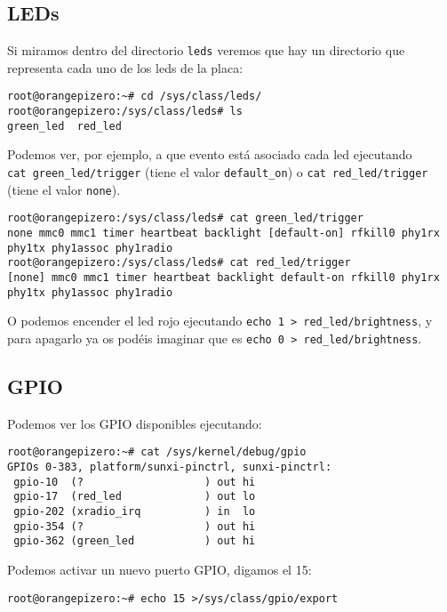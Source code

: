 \documentclass[12pt,spanish,]{scrartcl}
\begin{document}
\hypertarget{leds}{%
\subsection{LEDs}\label{leds}}

Si miramos dentro del directorio \texttt{leds} veremos que hay un
directorio que representa cada uno de los leds de la placa:

\begin{verbatim}
root@orangepizero:~# cd /sys/class/leds/
root@orangepizero:/sys/class/leds# ls
green_led  red_led
\end{verbatim}

Podemos ver, por ejemplo, a que evento está asociado cada led ejecutando
\texttt{cat\ green\_led/trigger} (tiene el valor \texttt{default\_on}) o
\texttt{cat\ red\_led/trigger} (tiene el valor \texttt{none}).

\begin{verbatim}
root@orangepizero:/sys/class/leds# cat green_led/trigger 
none mmc0 mmc1 timer heartbeat backlight [default-on] rfkill0 phy1rx phy1tx phy1assoc phy1radio 
root@orangepizero:/sys/class/leds# cat red_led/trigger 
[none] mmc0 mmc1 timer heartbeat backlight default-on rfkill0 phy1rx phy1tx phy1assoc phy1radio 
\end{verbatim}

O podemos encender el led rojo ejecutando
\texttt{echo\ 1\ \textgreater{}\ red\_led/brightness}, y para apagarlo
ya os podéis imaginar que es
\texttt{echo\ 0\ \textgreater{}\ red\_led/brightness}.

\hypertarget{gpio}{%
\subsection{GPIO}\label{gpio}}

Podemos ver los GPIO disponibles ejecutando:

\begin{verbatim}
root@orangepizero:~# cat /sys/kernel/debug/gpio
GPIOs 0-383, platform/sunxi-pinctrl, sunxi-pinctrl:
 gpio-10  (?                   ) out hi
 gpio-17  (red_led             ) out lo
 gpio-202 (xradio_irq          ) in  lo
 gpio-354 (?                   ) out hi
 gpio-362 (green_led           ) out hi
\end{verbatim}

Podemos activar un nuevo puerto GPIO, digamos el 15:

\begin{verbatim}
root@orangepizero:~# echo 15 >/sys/class/gpio/export
\end{verbatim}
\end{document}
